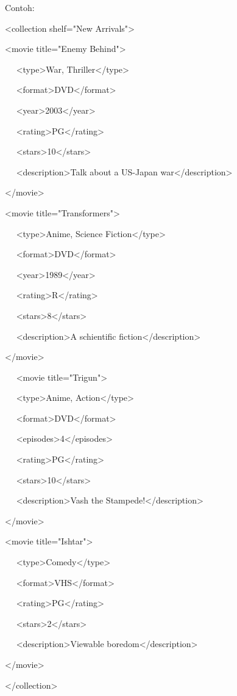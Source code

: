 \documentclass{wileySix}
\begin{document}
\begin{myEnumerate}
\vspace{12pt}
\vspace{12pt}
\noindent 
Contoh: \par
\noindent 
<collection shelf="New Arrivals"> \par
\noindent 
<movie title="Enemy Behind"> \par
\noindent 
~~ <type>War, Thriller</type> \par
\noindent 
~~ <format>DVD</format> \par
\noindent 
~~ <year>2003</year> \par
\noindent 
~~ <rating>PG</rating> \par
\noindent 
~~ <stars>10</stars> \par
\noindent 
~~ <description>Talk about a US-Japan war</description> \par
\noindent 
</movie> \par
\noindent 
<movie title="Transformers"> \par
\noindent 
~~ <type>Anime, Science Fiction</type> \par
\noindent 
~~ <format>DVD</format> \par
\noindent 
~~ <year>1989</year> \par
\noindent 
~~ <rating>R</rating> \par
\noindent 
~~ <stars>8</stars> \par
\noindent 
~~ <description>A schientific fiction</description> \par
\noindent 
</movie> \par
\noindent 
~~ <movie title="Trigun"> \par
\noindent 
~~ <type>Anime, Action</type> \par
\noindent 
~~ <format>DVD</format> \par
\noindent 
~~ <episodes>4</episodes> \par
\noindent 
~~ <rating>PG</rating> \par
\noindent 
~~ <stars>10</stars> \par
\noindent 
~~ <description>Vash the Stampede!</description> \par
\noindent 
</movie> \par
\noindent 
<movie title="Ishtar"> \par
\noindent 
~~ <type>Comedy</type> \par
\noindent 
~~ <format>VHS</format> \par
\noindent 
~~ <rating>PG</rating> \par
\noindent 
~~ <stars>2</stars> \par
\noindent 
~~ <description>Viewable boredom</description> \par
\noindent 
</movie> \par
\noindent 
</collection> \par
\vspace{10pt}
\noindent


\end{myEnumerate}
\end{document}
